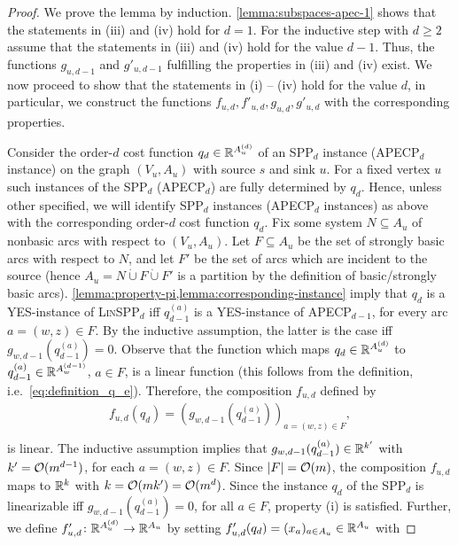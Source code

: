 \begin{proof}
    We prove the lemma by induction. \cref{lemma:subspaces-apec-1} shows that the statements in (iii) and (iv) hold  for $d = 1$. For the inductive step with $d\ge 2$  assume that the statements in (iii) and (iv) hold for the  value $d - 1$. Thus, the functions $g_{u,d-1}$ and $g'_{u,d-1}$ fulfilling the properties in (iii) and (iv) exist. We now proceed to show that the statements in (i) -- (iv) hold for the value $d$, in particular, we construct the functions $f_{u,d}, f'_{u,d}, g_{u,d}, g'_{u,d}$ with the corresponding properties.

    Consider the order-$d$ cost function $q_d \in \mathbb{R}^{A_u^{(d)}}$ of  an SPP$_d$ instance (APECP$_d$ instance)  on the graph $(V_u, A_u)$ with source $s$ and sink $u$. For a fixed vertex $u$ such instances of the SPP$_d$ (APECP$_d$) are fully determined by $q_d$. Hence, unless other specified,  we will identify SPP$_d$ instances (APECP$_d$ instances)  as above with the corresponding order-$d$ cost function $q_d$.  Fix some system $N \subseteq A_u$ of nonbasic arcs with respect to $(V_u, A_u)$. Let $F \subseteq A_u$ be the set of strongly basic arcs with respect to $N$, and let $F'$ be the set of arcs which are incident to the source (hence $A_u = N \dot\cup F \dot\cup F'$ is a partition by the definition of basic/strongly basic arcs).  \cref{lemma:property-pi,lemma:corresponding-instance} imply that  $q_d$ is a YES-instance of \textsc{Lin}SPP$_d$ iff   $q^{(a)}_{d-1}$ is a YES-instance of APECP$_{d-1}$, for every arc $a = (w,z) \in F$. By the inductive assumption, the latter is the case iff  $g_{w,d-1}(q^{(a)}_{d-1}) = 0$. Observe that the function which maps $q_d \in \mathbb{R}^{A_u^{(d)}}$ to $q^{(a)}_{d-1} \in \mathbb{R}^{A_w^{(d-1)}}$, $a\in F$,  is a linear function (this follows from the definition, i.e.\ \cref{eq:definition_q_e}).  Therefore, the composition  $f_{u,d}$ defined by 
    \begin{align*}
        f_{u,d}(q_d) = (g_{w,d-1}(q^{(a)}_{d-1}))_{a = (w,z) \in F}, \\
    \end{align*}
     is linear.  The inductive assumption implies  that   $g_{w,d-1}(q^{(a)}_{d-1})\in \mathbb{R}^{k'}$ with $k'=\mathcal{O}(m^{d-1})$, for each $a=(w,z)\in F$. Since   $|F|=\mathcal{O}(m)$, the composition $f_{u,d}$ maps to $\mathbb{R}^k$ with $k = \mathcal{O}(m k') = \mathcal{O}(m^d)$. 
      Since the instance $q_d$ of the SPP$_d$ is linearizable iff $g_{w,d-1}(q^{(a)}_{d-1}) = 0$, for all $a\in F$, property (i) is satisfied. Further,  we define $f'_{u,d}\colon \mathbb{R}^{A_u^{(d)}}\to \mathbb{R}^{A_u}$ by setting $f'_{u,d}(q_d)=(x_a)_{a\in A_u}\in \mathbb{R}^{A_u}$ with 

\end{proof}
